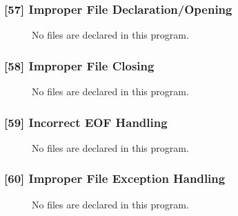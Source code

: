 \subsubsection{[57] Improper File Declaration/Opening}
\begin{description}
	\item[] No files are declared in this program.
\end{description}
\subsubsection{[58] Improper File Closing}
\begin{description}
	\item[] No files are declared in this program.
\end{description}
\subsubsection{[59] Incorrect EOF Handling}
\begin{description}
	\item[] No files are declared in this program.
\end{description}
\subsubsection{[60] Improper File Exception Handling}
\begin{description}
	\item[] No files are declared in this program.
\end{description}